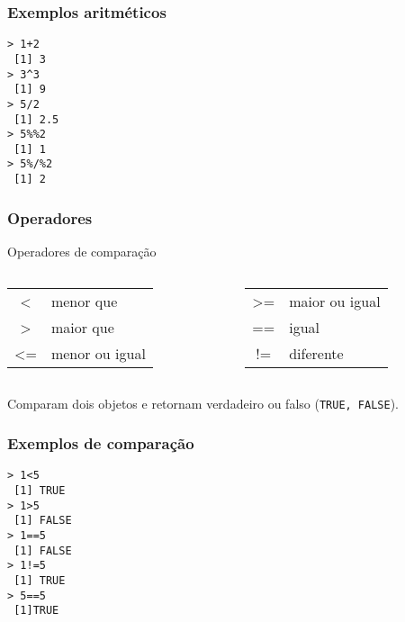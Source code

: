 \documentclass{beamer}
\begin{document}
\begin{frame}
  \frametitle{Exemplos aritméticos}
\texttt{> 1+2 \\
~[1] 3\\
 > 3\^{}3\\
 ~[1] 9 \\
> 5/2 \\
~[1] 2.5 \\ \pause
> 5\%\%2 \\
~[1] 1 \\ \pause
> 5\%/\%2 \\
~[1] 2\\
} 
\end{frame}


\begin{frame}
  \frametitle{Operadores}
  \begin{block}{Operadores de comparação}
    \begin{columns}
      \begin{column}{5cm}
        \begin{tabular}{c l}
          \textless  & menor que  \\
          \textgreater  & maior que \\
          \textless = & menor ou igual\\
        \end{tabular}
      \end{column}


      \begin{column}{5cm}
        \begin{tabular}{c l}
          \textgreater= & maior ou igual\\
          == & igual\\
          != & diferente \\
         \end{tabular}
       \end{column}

    \end{columns}
  \end{block}
Comparam dois objetos e retornam verdadeiro ou falso (\texttt{TRUE, FALSE}).
\end{frame}

\begin{frame}
  \frametitle{Exemplos de comparação}
 
\texttt{> 1\textless 5  \\
~[1] TRUE \\ \pause
> 1\textgreater 5 \\
~[1] FALSE \\ \pause
> 1==5 \\
~[1] FALSE \\ \pause
> 1!=5\\
~[1] TRUE \\ \pause
> 5==5 \\
~[1]TRUE \\
}
\end{frame}
\end{document}
